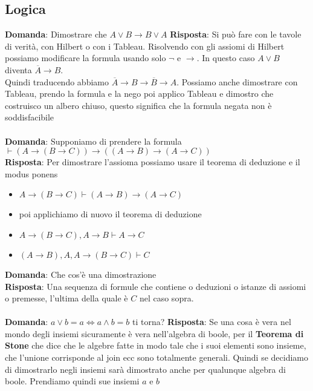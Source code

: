 \documentclass{article}
\begin{document}
\subsection{Logica}
\textbf{Domanda}: Dimostrare che $A \lor B \rightarrow B \lor A$
\textbf{Risposta}: Si può fare con le tavole di verità, con Hilbert o con i Tableau. Risolvendo con gli assiomi di Hilbert possiamo modificare la formula usando solo $\lnot$ e $\rightarrow$. In questo caso $A \lor B$ diventa $\overline{A} \rightarrow B$. \\
Quindi traducendo abbiamo $\overline{A} \rightarrow B \rightarrow \overline{B} \rightarrow A$. Possiamo anche dimostrare con Tableau, prendo la formula e la nego poi applico Tableau e dimostro che costruisco un albero chiuso, questo significa che la formula negata non è soddisfacibile \\ \\
\textbf{Domanda}: Supponiamo di prendere la formula $\vdash (A \rightarrow (B \rightarrow C)) \rightarrow ((A \rightarrow B) \rightarrow (A \rightarrow C))$ \\
\textbf{Risposta}: Per dimostrare l'assioma possiamo usare il teorema di deduzione e il modus ponens
\begin{itemize}
    \item $A \rightarrow (B \rightarrow C) \vdash (A \rightarrow B) \rightarrow (A \rightarrow C)$
    \item poi applichiamo di nuovo il teorema di deduzione
    \item $A \rightarrow (B \rightarrow C), A \rightarrow B \vdash A \rightarrow C$
    \item $(A \rightarrow B), A, A \rightarrow (B \rightarrow C) \vdash C$
\end{itemize}
\textbf{Domanda}: Che cos'è una dimostrazione \\
\textbf{Risposta}: Una sequenza di formule che contiene o deduzioni o istanze di assiomi o premesse, l'ultima della quale è $C$ nel caso sopra. \\ \\
\textbf{Domanda}: $a \lor b = a \iff a \land b = b$ ti torna?
\textbf{Risposta}: Se una cosa è vera nel mondo degli insiemi sicuramente è vera nell'algebra di boole, per il \textbf{Teorema di Stone} che dice che le algebre fatte in modo tale che i suoi elementi sono insieme, che l'unione corrisponde al join ecc sono totalmente generali. Quindi se decidiamo di dimostrarlo negli insiemi sarà dimostrato anche per qualunque algebra di boole. Prendiamo quindi sue insiemi $a$ e $b$
\end{document}
